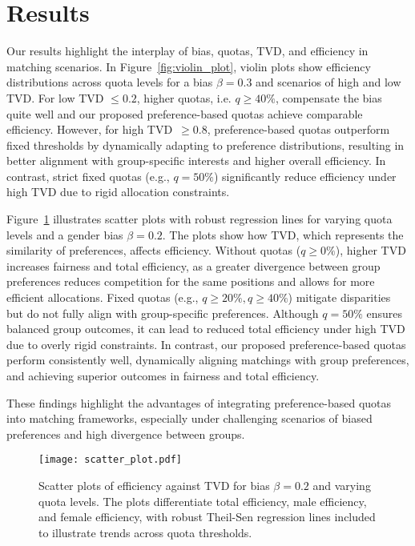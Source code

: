\documentclass[letterpaper]{article}
\begin{document}
\section{Results}

Our results highlight the interplay of bias, quotas, TVD, and efficiency in matching scenarios.
In Figure~\ref{fig:violin_plot}, violin plots show efficiency distributions across quota levels for a bias \( \beta = 0.3 \) and scenarios of high and low TVD. For low TVD \( \leq 0.2 \), higher quotas, i.e. \( q\geq 40\%\), compensate the bias quite well and our proposed preference-based quotas achieve comparable efficiency. However, for high TVD~\( \geq 0.8 \), preference-based quotas outperform fixed thresholds by dynamically adapting to preference distributions, resulting in better alignment with group-specific interests and higher overall efficiency. In contrast, strict fixed quotas (e.g., \( q = 50\% \)) significantly reduce efficiency under high TVD due to rigid allocation constraints.

Figure~\ref{fig:scatter_plot} illustrates scatter plots with robust regression lines for varying quota levels and a gender bias \( \beta = 0.2 \). The plots show how TVD, which represents the similarity of preferences, affects efficiency. Without quotas (\( q \geq 0\% \)), higher TVD increases fairness and total efficiency, as a greater divergence between group preferences reduces competition for the same positions and allows for more efficient allocations. Fixed quotas (e.g., \( q \geq 20\%, q \geq 40\% \)) mitigate disparities but do not fully align with group-specific preferences. Although \( q = 50\% \) ensures balanced group outcomes, it can lead to reduced total efficiency under high TVD due to overly rigid constraints. In contrast, our proposed preference-based quotas perform consistently well, dynamically aligning matchings with group preferences, and achieving superior outcomes in fairness and total efficiency.

These findings highlight the advantages of integrating preference-based quotas into matching frameworks, especially under challenging scenarios of biased preferences and high divergence between groups.

\begin{figure}[ht]

  \centering
  \texttt{[image: scatter\_plot.pdf]}
\caption{Scatter plots of efficiency against TVD for bias \( \beta = 0.2 \) and varying quota levels. The plots differentiate total efficiency, male efficiency, and female efficiency, with robust Theil-Sen regression lines included to illustrate trends across quota thresholds.}

  \label{fig:scatter_plot}
\end{figure}
\end{document}
